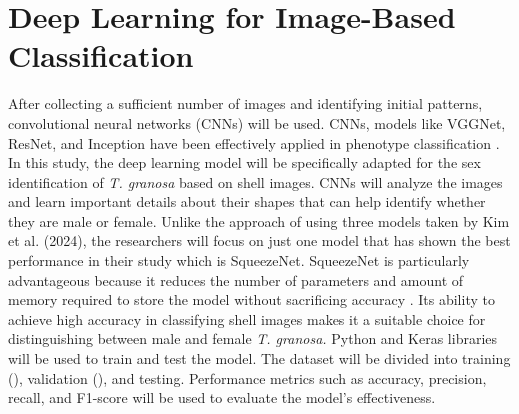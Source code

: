 \section{ Deep Learning for Image-Based Classification}
\label{sec:deeplearning}
After collecting a sufficient number of images and identifying initial patterns, convolutional neural networks (CNNs) will be used. CNNs, models like VGGNet, ResNet, and Inception have been effectively applied in phenotype classification \cite{kim2024}. In this study, the deep learning model will be specifically adapted for the sex identification of \textit{T. granosa} based on shell images. CNNs will analyze the images and learn important details about their shapes that can help identify whether they are male or female. 
Unlike the approach of using three models taken by Kim et al. (2024), the researchers will focus on just one model that has shown the best performance in their study which is SqueezeNet. SqueezeNet is particularly advantageous because it reduces the number of parameters and amount of memory required to store the model without sacrificing accuracy \cite{koonce2021}. Its ability to achieve high accuracy in classifying shell images makes it a suitable choice for distinguishing between male and female \textit{T. granosa.}
Python and Keras libraries will be used to train and test the model. The dataset will be divided into training (), validation (), and testing. Performance metrics such as accuracy, precision, recall, and F1-score will be used to evaluate the model's effectiveness.
